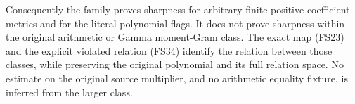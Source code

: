 Consequently the family proves sharpness for arbitrary finite positive coefficient metrics and for the literal polynomial flags. It does not prove sharpness within the original arithmetic or Gamma moment-Gram class. The exact map (FS23) and the explicit violated relation (FS34) identify the relation between those classes, while preserving the original polynomial and its full relation space. No estimate on the original source multiplier, and no arithmetic equality fixture, is inferred from the larger class.
